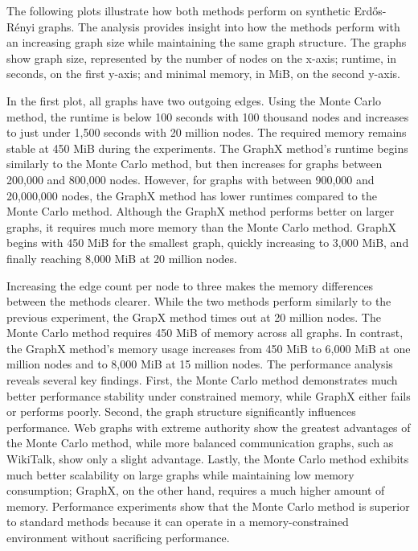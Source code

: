 The following plots illustrate how both methods perform on synthetic Erdős-Rényi graphs. The analysis provides insight into how the methods perform with an increasing graph size while maintaining the same graph structure. The graphs show graph size, represented by the number of nodes on the x-axis; runtime, in seconds, on the first y-axis; and minimal memory, in MiB, on the second y-axis.\par

In the first plot, all graphs have two outgoing edges. Using the Monte Carlo method, the runtime is below 100 seconds with 100 thousand nodes and increases to just under 1,500 seconds with 20 million nodes. The required memory remains stable at 450 MiB during the experiments. The GraphX method's runtime begins similarly to the Monte Carlo method, but then increases for graphs between 200,000 and 800,000 nodes. However, for graphs with between 900,000 and 20,000,000 nodes, the GraphX method has lower runtimes compared to the Monte Carlo method. Although the GraphX method performs better on larger graphs, it requires much more memory than the Monte Carlo method. GraphX begins with 450 MiB for the smallest graph, quickly increasing to 3,000 MiB, and finally reaching 8,000 MiB at 20 million nodes.\par
Increasing the edge count per node to three makes the memory differences between the methods clearer. While the two methods perform similarly to the previous experiment, the GrapX method times out at 20 million nodes. The Monte Carlo method requires 450 MiB of memory across all graphs. In contrast, the GraphX method's memory usage increases from 450 MiB to 6,000 MiB at one million nodes and to 8,000 MiB at 15 million nodes.
The performance analysis reveals several key findings. First, the Monte Carlo method demonstrates much better performance stability under constrained memory, while GraphX either fails or performs poorly. Second, the graph structure significantly influences performance. Web graphs with extreme authority show the greatest advantages of the Monte Carlo method, while more balanced communication graphs, such as WikiTalk, show only a slight advantage. Lastly, the Monte Carlo method exhibits much better scalability on large graphs while maintaining low memory consumption; GraphX, on the other hand, requires a much higher amount of memory. Performance experiments show that the Monte Carlo method is superior to standard methods because it can operate in a memory-constrained environment without sacrificing performance.


